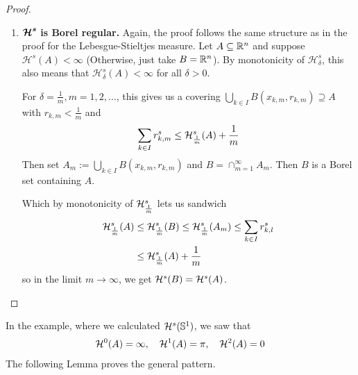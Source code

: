 \begin{proof}
\begin{enumerate}[{(}i{)}]
    \item $\bm{\mathcal{H}^{s}}$ \textbf{is Borel regular.}
      Again, the proof follows the same structure as in the proof for the Lebesgue-Stieltjes measure.
      Let $A \subseteq \mathbb{R}^{n}$ and suppose $\mathcal{H}^{s}(A) < \infty$ (Otherwise, just take $B = \mathbb{R}^{n}$).
      By monotonicity of $\mathcal{H}_{\delta}^{s}$, this also means that $\mathcal{H}_{\delta}^{s}(A) < \infty$ for all $\delta > 0$.

      For $\delta = \tfrac{1}{m}, m = 1, 2, \ldots$, this gives us a covering $\bigcup_{k\in I}B(x_{k,m}, r_{k,m}) \supseteq A$ with $r_{k,m} < \frac{1}{m}$ and 
    \begin{align*}
      \sum_{k \in I}r_{k,m}^{s} \leq \mathcal{H}_{\frac{1}{m}}^{s}(A) + \frac{1}{m}
    \end{align*}
    Then set $A_m := \bigcup_{k \in I}B(x_{k,m},r_{k,m})$ and $B = \cap_{m=1}^{\infty} A_m$.
    Then $B$ is a Borel set containing $A$.

    Which by monotonicity of $\mathcal{H}_{\frac{1}{m}}^{s}$ lets us sandwich
    \begin{align*}
      \mathcal{H}_{\frac{1}{m}}^{s}(A)
      &\leq \mathcal{H}_{\frac{1}{m}}^{s}(B) 
      \leq \mathcal{H}_{\frac{1}{m}}^{s}(A_m) \leq \sum_{k \in I}r_{k,l}^{s}\\
      &\leq \mathcal{H}_{\frac{1}{m}}^{s}(A) + \frac{1}{m}
    \end{align*}
    so in the limit $m \to \infty$, we get $\mathcal{H}^{s}(B) = \mathcal{H}^{s}(A)$.
  \end{enumerate}
\end{proof}

In the example, where we calculated $\mathcal{H}^{s}(\mathbb{S}^{1})$, we saw that
\begin{align*}
  \mathcal{H}^{0}(A) = \infty, \quad \mathcal{H}^{1}(A) = \pi, \quad \mathcal{H}^{2}(A) = 0
\end{align*}
The following Lemma proves the general pattern.

